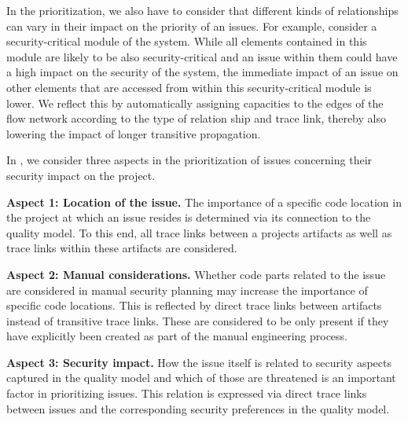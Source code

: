 	In the prioritization, we also have to consider that different kinds of relationships can vary in their impact on the priority of an issues.
	For example, consider a security-critical module of the system.
	While all elements contained in this module are likely to be also security-critical and an issue within them could have a high impact on the security of the system, the immediate impact of an issue on other elements that are accessed from within this security-critical module is lower.
	We reflect this by automatically assigning capacities to the edges of the flow network according to the type of relation ship and trace link, thereby also lowering the impact of longer transitive propagation.

	    In \appr{}, we consider three aspects in the prioritization of issues concerning their security impact on the project.
	    \begin{description}
	        \item \textbf{Aspect 1: Location of the issue.} The importance of a specific code location in the project at which an issue resides is determined via its connection to the quality model. To this end, all trace links between a projects artifacts as well as trace links within these artifacts are considered.
	        \item \textbf{Aspect 2: Manual considerations.} Whether code parts related to the issue are considered in manual security planning may increase the importance of specific code locations. This is reflected by direct trace links between artifacts instead of transitive trace links. These are considered to be only present if they have explicitly been created as part of the manual engineering process.
	        \item \textbf{Aspect 3: Security impact.} How the issue itself is related to security aspects captured in the quality model and which of those are threatened is an important factor in prioritizing issues. This relation is expressed via direct trace links between issues and the corresponding security preferences in the quality model.
	    \end{description}


